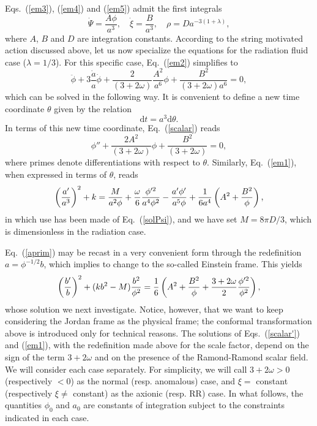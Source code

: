 \documentclass[a4paper,aps,twocolumn,prd,showpacs,nofootinbib]{revtex4}
\newcommand{\dd}{\mathrm{d}}
\begin{document}
Eqs.~(\ref{em3}), (\ref{em4}) and (\ref{em5}) admit the first
integrals
\begin{equation}
\dot\Psi = \frac{A\phi}{a^3}, \quad \dot\xi = \frac{B}{a^3}, \quad
\rho = D a^{- 3(1 + \lambda)}, \label{solPsi}
\end{equation}
where $A$, $B$ and $D$ are integration constants. According to the
string motivated action discussed above, let us now specialize the
equations for the radiation fluid case ($\lambda = 1/3$).  For this
specific case, Eq.~(\ref{em2}) simplifies to
\begin{equation}
\label{scalar} \ddot\phi + 3\frac{\dot a}{a}\dot\phi + \frac{2}{(3
+ 2\omega)}\frac{A^2}{a^6}\phi + \frac{B^2}{(3 + 2 \omega)a^6} = 0,
\end{equation}
which can be solved in the following way. It is convenient to define a
new time coordinate $\theta$ given by the relation 
\begin{equation}
\dd t = a^3 \dd\theta.
\label{parameter}
\end{equation}
In terms of this new time coordinate, Eq.~(\ref{scalar}) reads
\begin{equation}
\label{scalar'} \phi'' + \frac{2A^2}{(3 + 2\omega)}\phi +
\frac{B^2}{(3 + 2 \omega)} = 0,
\end{equation}
where primes denote differentiations with respect to $\theta$.
Similarly, Eq.~(\ref{em1}), when expressed in terms of $\theta$, reads
\begin{equation} \left({a'\over a^3}\right)^2 +k={M\over a^2 \phi} +
{\omega \over 6} {\phi'^2 \over a^4 \phi^2} - {a'\phi'\over a^5 \phi}
+{1\over 6 a^4} \left( A^2 + {B^2\over
\phi}\right),\label{aprim}\end{equation} in which use has been made of
Eq.~(\ref{solPsi}), 
and we have set $M = 8\pi D/3$, which is dimensionless in the
radiation case.

Eq.~(\ref{aprim}) may be recast in a very convenient form through the
redefinition $a = \phi^{-1/2}b$, which implies to change to the
so-called Einstein frame. This yields
\begin{equation}
\left({b'\over b}\right)^2 + ( kb^2-M) {b^2\over\phi^2} = {1\over
6}\left( A^2 +{B^2\over \phi} + {3+2\omega\over 2}
{\phi'^2\over\phi^2}\right), \label{bprim}
\end{equation}
whose solution we next investigate. Notice, however, that we want to
keep considering the Jordan frame as the physical frame; the conformal
transformation above is introduced only for technical reasons. The
solutions of Eqs.~(\ref{scalar'}) and (\ref{em1}), with the
redefinition made above for the scale factor, depend on the sign of
the term $3 + 2\omega$ and on the presence of the Ramond-Ramond scalar
field. We will consider each case separately. For simplicity, we will
call $3 + 2\omega > 0$ (respectively $< 0$) as the normal
(resp. anomalous) case, and $\xi =$ constant (respectively $\xi \neq$
constant) as the axionic (resp. RR) case.  In what follows, the
quantities $\phi_0$ and $a_0$ are constants of integration subject to
the constraints indicated in each case.
\end{document}

